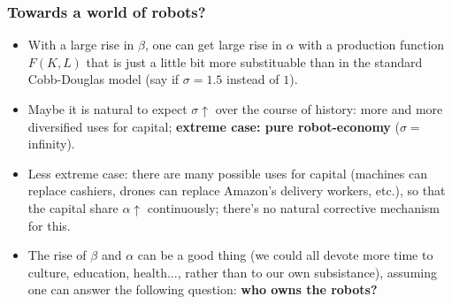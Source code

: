 \begin{frame}[label=Robots]
\frametitle{Towards a world of robots?}
\begin{itemize}
\item
With a large rise in $\beta$, one can get large rise in $\alpha$ with a production function $F(K,L)$ that is just a little bit more substituable than in the standard Cobb-Douglas model (say if $\sigma = 1.5$ instead of $1$).
\item
Maybe it is natural to expect $\sigma \uparrow$ over the course of history: more and more diversified uses for capital;
\textbf{extreme case: pure robot-economy} ($\sigma = $ infinity).
\item
Less extreme case: there are many possible uses for capital (machines can replace cashiers, drones can replace Amazon's delivery workers, etc.), so that the capital share $\alpha \uparrow$ continuously; there's no natural corrective mechanism for this.
\item
The rise of $\beta$ and $\alpha$ can be a good thing (we could all devote more time to culture, education, health..., rather than to our own subsistance), assuming one can answer the following question: \textbf{who owns the robots?}
\end{itemize}
\end{frame}


